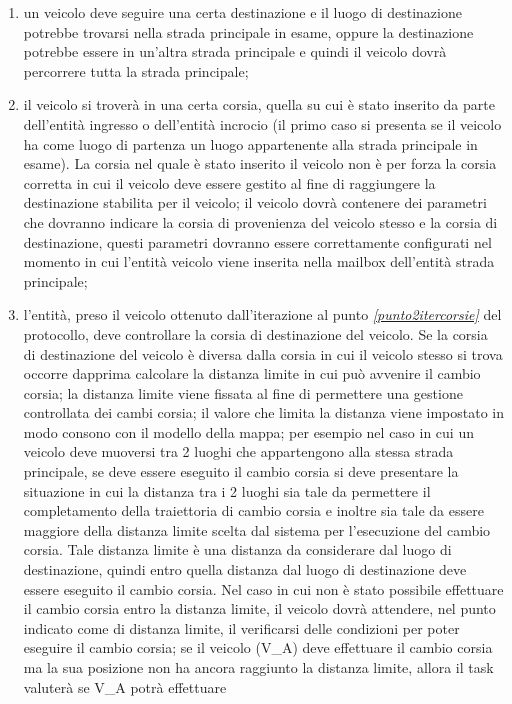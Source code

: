 \begin{enumerate}
\begin{enumerate}
\item un veicolo deve seguire una certa destinazione e il luogo di destinazione potrebbe trovarsi nella strada principale in esame, oppure la destinazione potrebbe essere in un'altra strada principale e quindi il veicolo dovrà percorrere tutta la strada principale;
\item il veicolo si troverà in una certa corsia, quella su cui è stato inserito
da parte dell'entità ingresso o dell'entità incrocio (il primo caso si presenta
se il veicolo ha come luogo di partenza un luogo appartenente alla strada
principale in esame). La corsia nel quale è stato inserito il veicolo non è per
forza la corsia corretta in cui il veicolo deve essere gestito al fine di
raggiungere la destinazione stabilita per il veicolo; il veicolo dovrà
contenere dei parametri che dovranno indicare la corsia di provenienza del
veicolo stesso e la corsia di destinazione, questi parametri dovranno essere
correttamente configurati nel momento in cui l'entità veicolo viene inserita
nella mailbox dell'entità strada principale;
\item l'entità, preso il veicolo ottenuto dall'iterazione al punto \textit{\ref{punto2itercorsie}}
del protocollo, deve controllare la corsia di destinazione del veicolo. Se la
corsia di destinazione del veicolo è diversa dalla corsia in cui il veicolo
stesso si trova occorre dapprima calcolare la distanza limite in cui può
avvenire il cambio corsia; la distanza limite viene fissata al fine di
permettere una gestione controllata dei cambi corsia; il valore che limita la
distanza viene impostato in modo consono con il modello della mappa; per
esempio nel caso in cui un veicolo deve muoversi tra 2 luoghi che appartengono
alla stessa strada principale, se deve essere eseguito il cambio corsia si deve
presentare la situazione in cui la distanza tra i 2 luoghi sia tale da
permettere il completamento della traiettoria di cambio corsia e inoltre sia
tale da essere maggiore della distanza limite scelta dal sistema per
l'esecuzione del cambio corsia. Tale distanza limite è una distanza da
considerare dal luogo di destinazione, quindi entro quella distanza dal luogo
di destinazione deve essere eseguito il cambio corsia. Nel caso in cui non è
stato possibile effettuare il cambio corsia entro la distanza limite, il
veicolo dovrà attendere, nel punto indicato come di distanza limite, il
verificarsi delle condizioni per poter eseguire il cambio corsia; se il veicolo
(V\_A) deve effettuare il cambio corsia ma la sua posizione non ha ancora
raggiunto la distanza limite, allora il task valuterà se V\_A potrà effettuare

\end{enumerate}
\end{enumerate}
